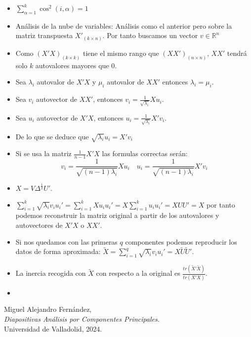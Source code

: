 \documentclass{article}
\begin{document}
\begin{itemize}
    \item $\sum_{\alpha=1}^{k}\cos^2(i,\alpha)=1$
    \item Análisis de la nube de variables: Análisis como el anterior pero sobre la matriz transpuesta $X'_{(k\times n)}$. Por tanto buscamos un vector $v\in\mathbb{R}^n$
    \item Como $(X'X)_{(k\times k)}$ tiene el mismo rango que $(XX')_{(n\times n)}$, $XX'$ tendrá solo $k$ autovalores mayores que 0.
    \item Sea $\lambda_i$ autovalor de $X'X$ y $\mu_i$ autovalor de $XX'$ entonces $\lambda_i = \mu_i$.
    \item Sea $v_i$ autovector de $XX'$, entonces $v_i = \frac{1}{\sqrt{\lambda_i}}Xu_i$.
    \item Sea $u_i$ autovector de $X'X$, entonces $u_i = \frac{1}{\sqrt{\lambda_i}}X'v_i$.
    \item De lo que se deduce que $\sqrt{\lambda_i}u_i = X'v_i$
    \item Si se usa la matriz $\frac{1}{n-1}X'X$ las formulas correctas serán:
          \[v_i=\frac{1}{\sqrt{(n-1)\lambda_i}}Xu_i \quad u_i=\frac{1}{\sqrt{(n-1)\lambda_i}}X'v_i\]
    \item $X=V\Delta^\frac{1}{2}U'$.
    \item $\sum_{i=1}^{k}\sqrt{\lambda_i}v_iu_i'=\sum_{i=1}^{k}Xu_iu_i'=X\sum_{i=1}^{k}u_iu_i'=XUU'=X$ por tanto podemos reconstruir la matriz original a partir de los autovalores y autovectores de $X'X$ o $XX'$.
    \item Si nos quedamos con las primeras $q$ componentes podemos reproducir los datos de forma aproximada: $\tilde{X}=\sum_{i=1}^{q}\sqrt{\lambda_i}v_iu_i'=X\tilde{U}\tilde{U}'$.
    \item La inercia recogida con $\tilde{X}$ con respecto a la original es $\frac{tr(\tilde{X}'\tilde{X})}{tr(X'X)}$.
    \item
\end{itemize}

\newpage


\begin{thebibliography}{9}
    Miguel Alejandro Fernández, \\ \textit{Diapositivas Análisis por Componentes Principales}. \\ Universidad de Valladolid, 2024.
\end{thebibliography}

% 
% 

\end{document}
